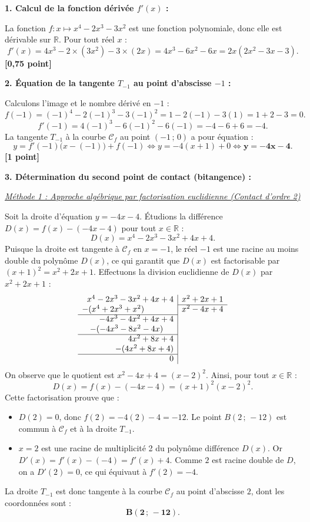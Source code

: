 \documentclass[11pt,a4paper]{article}
\newcommand{\R}{\mathbb{R}}
\begin{document}
\begin{correctionbox}
\textbf{1. Calcul de la fonction dérivée $f'(x)$ :}

La fonction $f : x \mapsto x^4 - 2x^3 - 3x^2$ est une fonction polynomiale, donc elle est dérivable sur $\R$. Pour tout réel $x$ :
\[
f'(x) = 4x^3 - 2 \times (3x^2) - 3 \times (2x) = 4x^3 - 6x^2 - 6x = 2x(2x^2 - 3x - 3).
\] \hfill \textbf{[0{,}75 point]}

\medskip
\textbf{2. Équation de la tangente $T_{-1}$ au point d'abscisse $-1$ :}

Calculons l'image et le nombre dérivé en $-1$ :
\[
f(-1) = (-1)^4 - 2(-1)^3 - 3(-1)^2 = 1 - 2(-1) - 3(1) = 1 + 2 - 3 = 0.
\]
\[
f'(-1) = 4(-1)^3 - 6(-1)^2 - 6(-1) = -4 - 6 + 6 = -4.
\]
La tangente $T_{-1}$ à la courbe $\mathcal{C}_f$ au point $(-1\,;\,0)$ a pour équation :
\[
y = f'(-1)\bigl(x - (-1)\bigr) + f(-1) \iff y = -4(x + 1) + 0 \iff \mathbf{y = -4x - 4}.
\] \hfill \textbf{[1 point]}

\medskip
\textbf{3. Détermination du second point de contact (bitangence) :}

\medskip
\underline{\textit{Méthode 1 : Approche algébrique par factorisation euclidienne (Contact d'ordre 2)}}

Soit la droite d'équation $y = -4x - 4$. Étudions la différence $D(x) = f(x) - (-4x - 4)$ pour tout $x \in \R$ :
\[
D(x) = x^4 - 2x^3 - 3x^2 + 4x + 4.
\]
Puisque la droite est tangente à $\mathcal{C}_f$ en $x = -1$, le réel $-1$ est une racine au moins double du polynôme $D(x)$, ce qui garantit que $D(x)$ est factorisable par $(x + 1)^2 = x^2 + 2x + 1$.
Effectuons la division euclidienne de $D(x)$ par $x^2 + 2x + 1$ :
\[
\begin{array}{r|l}
x^4 - 2x^3 - 3x^2 + 4x + 4 & x^2 + 2x + 1 \\
\cline{2-2}
-(x^4 + 2x^3 + x^2)\phantom{+4x+4} & x^2 - 4x + 4 \\
\cline{1-1}
-4x^3 - 4x^2 + 4x + 4 & \\
-(-4x^3 - 8x^2 - 4x)\phantom{+4} & \\
\cline{1-1}
4x^2 + 8x + 4 & \\
-(4x^2 + 8x + 4) & \\
\cline{1-1}
0 & 
\end{array}
\]
On observe que le quotient est $x^2 - 4x + 4 = (x - 2)^2$. Ainsi, pour tout $x \in \R$ :
\[
D(x) = f(x) - (-4x - 4) = (x + 1)^2 (x - 2)^2.
\]
Cette factorisation prouve que :
\begin{itemize}[leftmargin=*]
    \item $D(2) = 0$, donc $f(2) = -4(2) - 4 = -12$. Le point $B(2\,;\,-12)$ est commun à $\mathcal{C}_f$ et à la droite $T_{-1}$.
    \item $x = 2$ est une racine de multiplicité 2 du polynôme différence $D(x)$. Or $D'(x) = f'(x) - (-4) = f'(x) + 4$. Comme $2$ est racine double de $D$, on a $D'(2) = 0$, ce qui équivaut à $f'(2) = -4$.
\end{itemize}
La droite $T_{-1}$ est donc tangente à la courbe $\mathcal{C}_f$ au point d'abscisse $2$, dont les coordonnées sont :
\[
\mathbf{B(2\,;\,-12)}.
\]


\end{correctionbox}
\end{document}
